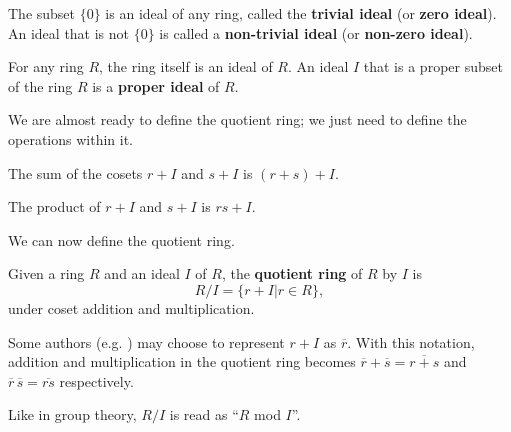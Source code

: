 \begin{example}
    The subset $\{0\}$ is an ideal of any ring, called the \textbf{trivial ideal} (or \textbf{zero ideal}). An ideal that is not $\{0\}$ is called a \textbf{non-trivial ideal} (or \textbf{non-zero ideal}).
\end{example}
\begin{example}
    For any ring $R$, the ring itself is an ideal of $R$. An ideal $I$ that is a proper subset of the ring $R$ is a \textbf{proper ideal} of $R$.
\end{example}

We are almost ready to define the quotient ring; we just need to define the operations within it.
\begin{definition}
    The sum of the cosets $r+I$ and $s+I$ is $(r+s)+I$.
\end{definition}
\begin{definition}
    The product of $r+I$ and $s+I$ is $rs+I$.
\end{definition}

We can now define the quotient ring.
\begin{definition}
    Given a ring $R$ and an ideal $I$ of $R$, the \textbf{quotient ring} of $R$ by $I$ is
    \[
        R/I = \{r + I \vert r \in R\},
    \]
    under coset addition and multiplication.
\end{definition}
\begin{remark}
    Some authors (e.g. \cite[p.~243]{dummit_foote_2004}) may choose to represent $r + I$ as $\overline{r}$. With this notation, addition and multiplication in the quotient ring becomes $\overline{r}+\overline{s} = \overline{r+s}$ and $\overline{r}\,\overline{s} = \overline{rs}$ respectively.
\end{remark}
\begin{remark}
    Like in group theory, $R/I$ is read as ``$R$ mod $I$''.
\end{remark}

